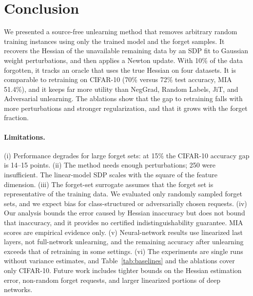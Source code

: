 \documentclass[10pt,twocolumn,letterpaper]{article}
\begin{document}
\section{Conclusion}
\label{sec:conclusion}
We presented a source-free unlearning method that removes arbitrary random training instances using only the trained model and the forget samples. It recovers the Hessian of the unavailable remaining data by an SDP fit to Gaussian weight perturbations, and then applies a Newton update. With 10\% of the data forgotten, it tracks an oracle that uses the true Hessian on four datasets. It is comparable to retraining on CIFAR-10 (70\% versus 72\% test accuracy, MIA 51.4\%), and it keeps far more utility than NegGrad, Random Labels, JiT, and Adversarial unlearning. The ablations show that the gap to retraining falls with more perturbations and stronger regularization, and that it grows with the forget fraction.

\paragraph{Limitations.}
(i) Performance degrades for large forget sets: at 15\% the CIFAR-10 accuracy gap is 14--15 points. (ii) The method needs enough perturbations; 250 were insufficient. The linear-model SDP scales with the square of the feature dimension. (iii) The forget-set surrogate assumes that the forget set is representative of the training data. We evaluated only randomly sampled forget sets, and we expect bias for class-structured or adversarially chosen requests. (iv) Our analysis bounds the error caused by Hessian inaccuracy but does not bound that inaccuracy, and it provides no certified indistinguishability guarantee. MIA scores are empirical evidence only. (v) Neural-network results use linearized last layers, not full-network unlearning, and the remaining accuracy after unlearning exceeds that of retraining in some settings. (vi) The experiments are single runs without variance estimates, and Table~\ref{tab:baselines} and the ablations cover only CIFAR-10. Future work includes tighter bounds on the Hessian estimation error, non-random forget requests, and larger linearized portions of deep networks.

{
    \small
    
    
}

\end{document}
